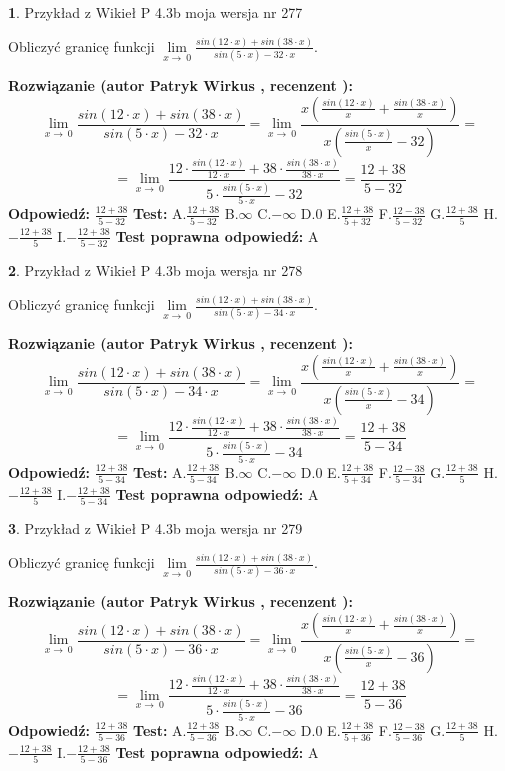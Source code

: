\documentclass[12pt, a4paper]{article}
\theoremstyle{definition} %
\newtheorem{zad}{}
\newcommand{\zadStart}[1]{\begin{zad}#1\newline}
\newcommand{\zadStop}{\end{zad}}
\newcommand{\rozwStart}[2]{\noindent \textbf{Rozwiązanie (autor #1 , recenzent #2): }\newline}
\newcommand{\rozwStop}{\newline}
\newcommand{\odpStart}{\noindent \textbf{Odpowiedź:}\newline}
\newcommand{\odpStop}{\newline}
\newcommand{\testStart}{\noindent \textbf{Test:}\newline}
\newcommand{\testStop}{\newline}
\newcommand{\kluczStart}{\noindent \textbf{Test poprawna odpowiedź:}\newline}
\newcommand{\kluczStop}{\newline}
\begin{document}
\zadStart{Przykład z Wikieł P 4.3b moja wersja nr 277}


Obliczyć granicę funkcji $\lim\limits_{x\to\ 0}\frac{sin(12 \cdot x)+sin(38 \cdot x)}{sin(5 \cdot x)-32 \cdot x}$.
\zadStop
\rozwStart{Patryk Wirkus}{}
$$\lim\limits_{x\to\ 0}\frac{sin(12 \cdot x)+sin(38 \cdot x)}{sin(5 \cdot x)-32 \cdot x}=\lim\limits_{x\to\ 0}\frac{x(\frac{sin(12 \cdot x)}{x}+\frac{sin(38 \cdot x)}{x})}{x(\frac{sin(5 \cdot x)}{x}-32)}=$$
$$=\lim\limits_{x\to\ 0}\frac{12 \cdot \frac{sin(12 \cdot x)}{12 \cdot x}+38 \cdot \frac{sin(38 \cdot x)}{38 \cdot x}}{5 \cdot \frac{sin(5 \cdot x)}{5 \cdot x}-32}=\frac{12+38}{5-32}$$
\rozwStop
\odpStart
$\frac{12+38}{5-32}$
\odpStop
\testStart
A.$\frac{12+38}{5-32}$
B.$\infty$
C.$-\infty$
D.$0$
E.$\frac{12+38}{5+32}$
F.$\frac{12-38}{5-32}$
G.$\frac{12+38}{5}$
H.$-\frac{12+38}{5}$
I.$-\frac{12+38}{5-32}$
\testStop
\kluczStart
A
\kluczStop



\zadStart{Przykład z Wikieł P 4.3b moja wersja nr 278}


Obliczyć granicę funkcji $\lim\limits_{x\to\ 0}\frac{sin(12 \cdot x)+sin(38 \cdot x)}{sin(5 \cdot x)-34 \cdot x}$.
\zadStop
\rozwStart{Patryk Wirkus}{}
$$\lim\limits_{x\to\ 0}\frac{sin(12 \cdot x)+sin(38 \cdot x)}{sin(5 \cdot x)-34 \cdot x}=\lim\limits_{x\to\ 0}\frac{x(\frac{sin(12 \cdot x)}{x}+\frac{sin(38 \cdot x)}{x})}{x(\frac{sin(5 \cdot x)}{x}-34)}=$$
$$=\lim\limits_{x\to\ 0}\frac{12 \cdot \frac{sin(12 \cdot x)}{12 \cdot x}+38 \cdot \frac{sin(38 \cdot x)}{38 \cdot x}}{5 \cdot \frac{sin(5 \cdot x)}{5 \cdot x}-34}=\frac{12+38}{5-34}$$
\rozwStop
\odpStart
$\frac{12+38}{5-34}$
\odpStop
\testStart
A.$\frac{12+38}{5-34}$
B.$\infty$
C.$-\infty$
D.$0$
E.$\frac{12+38}{5+34}$
F.$\frac{12-38}{5-34}$
G.$\frac{12+38}{5}$
H.$-\frac{12+38}{5}$
I.$-\frac{12+38}{5-34}$
\testStop
\kluczStart
A
\kluczStop



\zadStart{Przykład z Wikieł P 4.3b moja wersja nr 279}


Obliczyć granicę funkcji $\lim\limits_{x\to\ 0}\frac{sin(12 \cdot x)+sin(38 \cdot x)}{sin(5 \cdot x)-36 \cdot x}$.
\zadStop
\rozwStart{Patryk Wirkus}{}
$$\lim\limits_{x\to\ 0}\frac{sin(12 \cdot x)+sin(38 \cdot x)}{sin(5 \cdot x)-36 \cdot x}=\lim\limits_{x\to\ 0}\frac{x(\frac{sin(12 \cdot x)}{x}+\frac{sin(38 \cdot x)}{x})}{x(\frac{sin(5 \cdot x)}{x}-36)}=$$
$$=\lim\limits_{x\to\ 0}\frac{12 \cdot \frac{sin(12 \cdot x)}{12 \cdot x}+38 \cdot \frac{sin(38 \cdot x)}{38 \cdot x}}{5 \cdot \frac{sin(5 \cdot x)}{5 \cdot x}-36}=\frac{12+38}{5-36}$$
\rozwStop
\odpStart
$\frac{12+38}{5-36}$
\odpStop
\testStart
A.$\frac{12+38}{5-36}$
B.$\infty$
C.$-\infty$
D.$0$
E.$\frac{12+38}{5+36}$
F.$\frac{12-38}{5-36}$
G.$\frac{12+38}{5}$
H.$-\frac{12+38}{5}$
I.$-\frac{12+38}{5-36}$
\testStop
\kluczStart
A
\kluczStop
\end{document}
